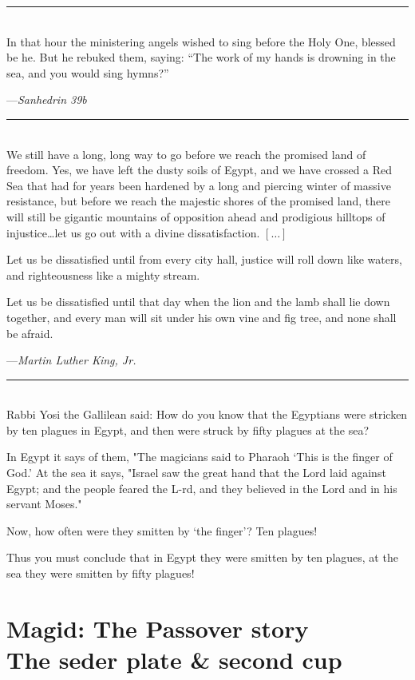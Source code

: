 \documentclass[a4paper,10pt,openany]{memoir}
\newcommand{\HgEllipsis}{\ensuremath{\left[\ldots\right]}}
\newcommand{\HgSource}[1]{\hfill{\small---\itshape{#1}}}
\newcommand{\HgFill}{\vfill \hrule \vfill}
\newenvironment{HgEnglish}{\strut\\\noindent}{\vspace{1em}}
\newcommand{\LSrc}{\textsuperscript{\upshape{[L]}}}
\begin{document}
\HgFill

\begin{HgEnglish}
  In that hour the ministering angels wished to sing before the Holy One,
  blessed be he. But he rebuked them, saying: ``The work of my hands is drowning
  in the sea, and you would sing hymns?''
  
  \HgSource{Sanhedrin 39b}
\end{HgEnglish}

\HgFill

\begin{HgEnglish}
We still have a long, long way to go before we reach the promised land of
freedom. Yes, we have left the dusty soils of Egypt, and we have crossed a Red
Sea that had for years been hardened by a long and piercing winter of massive
resistance, but before we reach the majestic shores of the promised land, there
will still be gigantic mountains of opposition ahead and prodigious hilltops of
injustice\ldots{}let us go out with a divine dissatisfaction. \HgEllipsis

Let us be dissatisfied until from every city hall, justice will roll down like
waters, and righteousness like a mighty
stream.

Let us be dissatisfied until that day when the lion and the lamb shall lie down
together, and every man will sit under
his own vine and fig tree, and none shall be afraid.

\HgSource{Martin Luther King, Jr.}
\end{HgEnglish}

\HgFill

\begin{HgEnglish}
Rabbi Yosi the Gallilean said: How do you know that the Egyptians were stricken
by ten plagues in Egypt, and then were struck by fifty plagues at the sea?

In Egypt it says of them, "The magicians said to Pharaoh `This is the finger of
God.' At the sea it says, "Israel saw the great hand that the Lord laid against
Egypt; and the people feared the L-rd, and they believed in the Lord and in his
servant Moses."

Now, how often were they smitten by `the finger'? Ten plagues!

Thus you must conclude that in Egypt they were smitten by ten plagues, at the
sea they were smitten by fifty plagues! \LSrc

\end{HgEnglish}

\chapter*{Magid: The Passover story\\ {\LARGE The seder plate \& second cup}}
\vspace{-2em}
\end{document}
